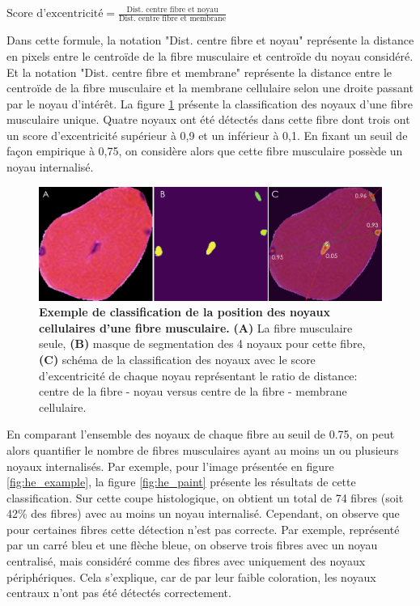 \(\text{Score d'excentricité} = \frac{\text{Dist. centre fibre et noyau}}{\text{Dist. centre fibre et membrane}}\)

Dans cette formule, la notation "Dist. centre fibre et noyau" représente la distance en pixels entre le centroïde de la fibre musculaire et centroïde du noyau considéré. Et la notation "Dist. centre fibre et membrane" représente la distance entre le centroïde de la fibre musculaire et la membrane cellulaire selon une droite passant par le noyau d'intérêt. La figure \ref{fig:he_single_nuc}  présente la classification des noyaux d'une fibre musculaire unique. Quatre noyaux ont été détectés dans cette fibre dont trois ont un score d'excentricité supérieur à 0,9 et un inférieur à 0,1. En fixant un seuil de façon empirique à 0,75, on considère alors que cette fibre musculaire possède un noyau internalisé.
\begin{figure}[!ht]
 \centering
 \includegraphics[width=1\textwidth]{figures/he_single_nuc.png}
 \caption[Exemple de classification de la position des noyaux]{\textbf{Exemple de classification de la position des noyaux cellulaires d'une fibre musculaire.} \textbf{(A)} La fibre musculaire seule,\textbf{ (B)} masque de segmentation des 4 noyaux pour cette fibre,\textbf{ (C)} schéma de la classification des noyaux avec le score d'excentricité de chaque noyau représentant le ratio de distance: centre de la fibre - noyau versus centre de la fibre - membrane cellulaire.}
 \label{fig:he_single_nuc}
\end{figure}
En comparant l'ensemble des noyaux de chaque fibre au seuil de 0.75, on peut alors quantifier le nombre de fibres musculaires ayant au moins un ou plusieurs noyaux internalisés. Par exemple, pour l'image présentée en figure \ref{fig:he_example}, la figure \ref{fig:he_paint} présente les résultats de cette classification. Sur cette coupe histologique, on obtient un total de 74 fibres (soit 42\% des fibres) avec au moins un noyau internalisé. Cependant, on observe que pour certaines fibres cette détection n'est pas correcte. Par exemple, représenté par un carré bleu et une flèche bleue, on observe trois fibres avec un noyau centralisé, mais considéré comme des fibres avec uniquement des noyaux périphériques. Cela s'explique, car de par leur faible coloration, les noyaux centraux n'ont pas été détectés correctement.
